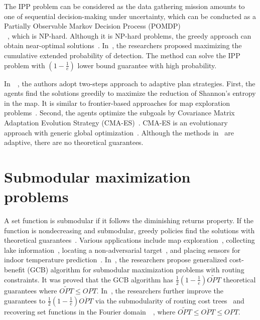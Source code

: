 The IPP problem can be considered as the data gathering mission amounts to one of sequential decision-making under uncertainty, which can be conducted as a Partially Observable Markov Decision Process (POMDP)\\~\cite{kadane1977optimal}, which is NP-hard.
Although it is NP-hard problems, the greedy approach can obtain near-optimal solutions~\cite{nemhauser1978analysis}.
In~\cite{tseng2017near}, the researchers proposed maximizing the cumulative extended probability of detection. The method can solve the IPP problem with $(1-\frac{1}{e})$ lower bound guarantee with high probability.


In~\cite{popovic2017online}~\cite{popovic2020informative}, the authors adopt two-steps approach to adaptive plan strategies.
First, the agents find the solutions greedily to maximize the reduction of Shannon’s entropy in the map.
It is similar to frontier-based approaches for map exploration problems~\cite{yamauchi1998frontier}.
Second, the agents optimize the subgoals by Covariance Matrix Adaptation Evolution Strategy (CMA-ES)~\cite{popovic2017multiresolution}\cite{popovic2017online}.
CMA-ES is an evolutionary approach with generic global optimization~\cite{hansen2006cma}.
Although the methods in~\cite{popovic2020informative}\cite{popovic2017online} are adaptive, there are no theoretical guarantees.

\section{Submodular maximization problems}
A set function is submodular if it follows the diminishing returns property. If the function is nondecreasing and submodular, greedy policies find the solutions with theoretical guarantees~\cite{nemhauser1978analysis}.
Various applications include map exploration~\cite{corah2019distributed}\cite{lu20203d}, collecting lake information~\cite{singh2009nonmyopic},  locating a non-adversarial target~\cite{hollinger2008proofs}\cite{tseng2017near}, and placing sensors for indoor temperature prediction~\cite{krause2006near}.
In~\cite{zhang2016submodular}, the researchers propose generalized cost-benefit (GCB) algorithm for submodular maximization problems with routing constraints.
It was proved that the GCB algorithm has $\frac{1}{2}(1-\frac{1}{e})\widetilde{OPT}$ theoretical guarantees where $\widetilde{OPT} \le OPT$.
In~\cite{lin2023improvement}, the researchers further improve the guarantees to $\frac{1}{2}(1-\frac{1}{e})\overline{OPT}$
via the submodularity of routing cost trees~\cite{flood1956traveling} and recovering set functions in the Fourier domain~\cite{stobbe2012learning}~\cite{tseng2017near}, where $\widetilde{OPT} \le \overline{OPT} \le OPT$.

